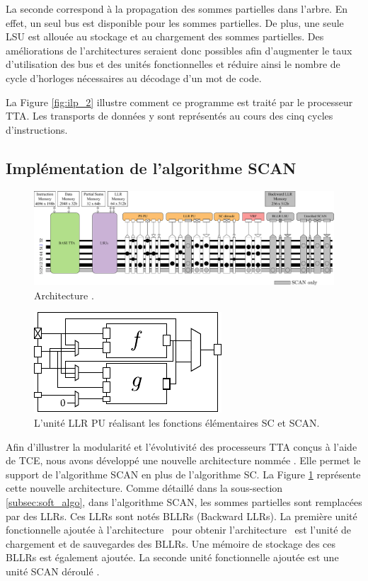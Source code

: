 La seconde correspond à la propagation des sommes partielles dans l'arbre. En effet, un seul bus est disponible pour les sommes partielles. De plus, une seule LSU est allouée au stockage et au chargement des sommes partielles. Des améliorations de l'architectures seraient donc possibles afin d'augmenter le taux d'utilisation des bus et des unités fonctionnelles et réduire ainsi le nombre de cycle d'horloges nécessaires au décodage d'un mot de code.

La Figure \ref{fig:ilp_2} illustre comment ce programme est traité par le processeur TTA. Les transports de données y sont représentés au cours des cinq cycles d'instructions.



\subsection{Implémentation de l'algorithme SCAN}

\begin{figure}[htp]
	\centering
	\includegraphics[width=\textwidth]{main/ch4_fig/archi_scan}
	\caption{Architecture \TTSCAN.}
	\label{fig:tt_scan}
\end{figure}
\begin{figure}[htp]
\centering
\includegraphics[scale=1.5]{main/ch4_fig/scan_unit}
\caption{L'unité \og LLR PU \fg réalisant les fonctions élémentaires SC et SCAN.}
\label{fig:scan_unit}
\end{figure}

Afin d'illustrer la modularité et l'évolutivité des processeurs TTA conçus à l'aide de TCE, nous avons développé une nouvelle architecture nommée \TTSCAN. Elle permet le support de l'algorithme SCAN en plus de l'algorithme SC. La Figure \ref{fig:tt_scan} représente cette nouvelle architecture.
Comme détaillé dans la sous-section \ref{subsec:soft_algo}, dans l'algorithme SCAN, les sommes partielles sont remplacées par des LLRs. Ces LLRs sont notés BLLRs (Backward LLRs). La première unité fonctionnelle ajoutée à l'architecture \TTSC~pour obtenir l'architecture \TTSCAN~est l'unité de chargement et de sauvegardes des BLLRs. Une mémoire de stockage des ces BLLRs est également ajoutée. La seconde unité fonctionnelle ajoutée est une unité \og SCAN déroulé \fg. 

